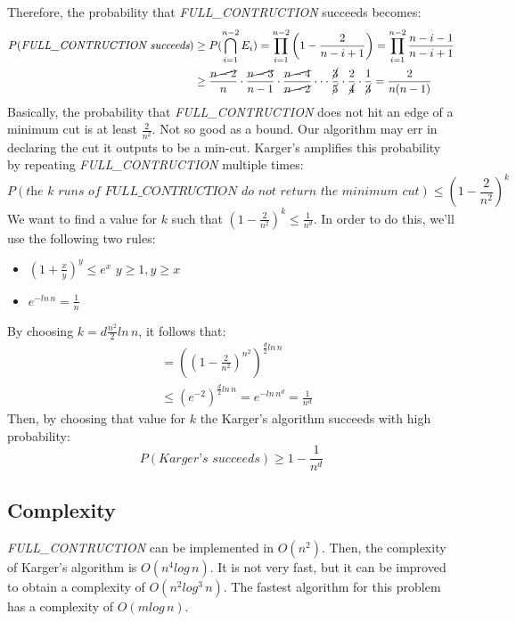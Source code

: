 Therefore, the probability that \textit{FULL\_CONTRUCTION} succeeds becomes:
\[
    \begin{split}
        P(\textit{FULL\_CONTRUCTION succeeds}) & \geq P(\bigcap_{i = 1}^{n-2}E_i) = \prod_{i = 1}^{n - 2}\left(1 - \frac{2}{n - i + 1}\right) = \prod_{i = 1}^{n-2} \frac{n - i -1}{n - i + 1}\\
        & \geq \frac{\cancel{n - 2}}{n} \cdot \frac{\cancel{n - 3}}{n - 1} \cdot \frac{\cancel{n - 4}}{\cancel{n - 2}} \cdot\cdot\cdot \frac{\cancel{3}}{\cancel{5}}\cdot\frac{2}{\cancel{4}}\cdot\frac{1}{\cancel{3}} = \frac{2}{n(n - 1)}
    \end{split}
\]
Basically, the probability that \textit{FULL\_CONTRUCTION} does not hit an edge of a minimum cut is at least $\frac{2}{n^2}$. Not so good as a bound. Our algorithm may err
in declaring the cut it outputs to be a min-cut. Karger's amplifies this probability by repeating \textit{FULL\_CONTRUCTION} multiple times:
\[P(\textit{the k runs of FULL\_CONTRUCTION do not return the minimum cut}) \leq \left(1 - \frac{2}{n^2}\right)^{k}\]
We want to find a value for $k$ such that $\left(1 - \frac{2}{n^2}\right)^{k} \leq \frac{1}{n^d}$. In order to do this, we'll use the following two rules:
\begin{itemize}
    \item $(1 + \frac{x}{y})^y \leq e^x \,\, y \geq 1, y \geq x$
    \item $e^{-ln\,n} = \frac{1}{n}$
\end{itemize}
By choosing $k = d\frac{n^2}{2}ln\,n$, it follows that:
\[
    \begin{split}
        & = \left(\left(1 - \frac{2}{n^2}\right)^{n^2}\right)^{\frac{d}{2}ln\, n}\\
        & \leq (e^{-2})^{\frac{d}{2}ln\, n} = e^{-ln\, n^d} = \frac{1}{n^d}
    \end{split}
\]
Then, by choosing that value for $k$ the Karger's algorithm succeeds with high probability:
\[P(\textit{Karger's succeeds}) \geq 1 - \frac{1}{n^d}\]

\subsection{Complexity}
\textit{FULL\_CONTRUCTION} can be implemented in $O(n^2)$. Then, the complexity of Karger's algorithm is $O(n^4log\, n)$. It is not very fast, but it can be improved to obtain a complexity of $O(n^2log^3\,n)$.\newline\newline
The fastest algorithm for this problem has a complexity of $O(m log\,n)$.
